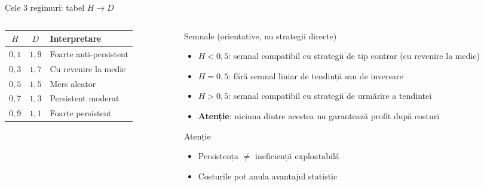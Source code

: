 \documentclass[9pt, aspectratio=169, t]{beamer}
\begin{document}
\begin{frame}[shrink=15]{Cele 3 regimuri: tabel $H \to D$}
\begin{cminipage}{0.95\textwidth}
\begin{columns}[T]
\begin{column}{0.50\textwidth}
\renewcommand{\arraystretch}{1.2}
\centering
\begin{tabular}{ccl}
\toprule
$H$ & $D$ & \textbf{Interpretare} \\
\midrule
$0{,}1$ & $1{,}9$ & Foarte anti-persistent \\
$0{,}3$ & $1{,}7$ & Cu revenire la medie \\
$0{,}5$ & $1{,}5$ & Mers aleator \\
$0{,}7$ & $1{,}3$ & Persistent moderat \\
$0{,}9$ & $1{,}1$ & Foarte persistent \\
\bottomrule
\end{tabular}
\end{column}
\begin{column}{0.46\textwidth}
\begin{block}{Semnale (orientative, nu strategii directe)}
\begin{itemize}\setlength{\itemsep}{0pt}
    \item $H<0{,}5$: semnal compatibil cu strategii de tip contrar (cu revenire la medie)
    \item $H=0{,}5$: fără semnal liniar de tendință sau de inversare
    \item $H>0{,}5$: semnal compatibil cu strategii de urmărire a tendinței
    \item \textbf{Atenție}: niciuna dintre acestea nu garantează profit după costuri
\end{itemize}
\end{block}
\begin{alertblock}{Atenție}
\begin{itemize}\setlength{\itemsep}{0pt}
    \item Persistența $\neq$ ineficiență exploatabilă
    \item Costurile pot anula avantajul statistic
\end{itemize}
\end{alertblock}
\end{column}
\end{columns}
\end{cminipage}
\end{frame}
\end{document}
